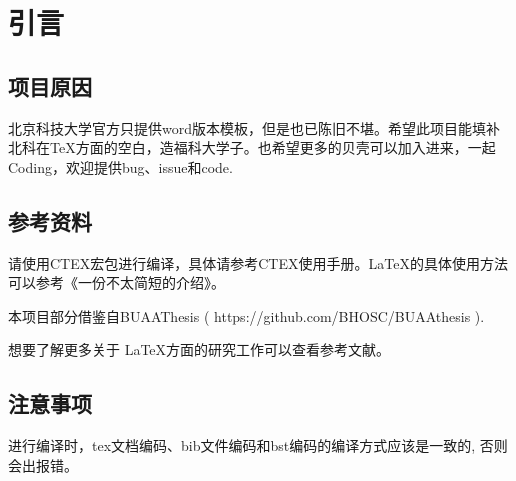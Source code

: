 
\chapter{引言}
\setcounter{page}{1}

\section{项目原因}
北京科技大学官方只提供word版本模板，但是也已陈旧不堪。希望此项目能填补北科在\TeX 方面的空白，造福科大学子。也希望更多的贝壳可以加入进来，一起Coding，欢迎提供bug、issue和code.
\section{参考资料}
请使用CTEX宏包进行编译，具体请参考CTEX使用手册。\LaTeX 的具体使用方法可以参考《一份不太简短的\LaTeXe 介绍》\cite{oetiker2002}。 \par
本项目部分借鉴自BUAAThesis ( https://github.com/BHOSC/BUAAthesis ). \par
想要了解更多关于 \LaTeX 方面的研究工作可以查看参考文献\cite{wenyayuan2012, wangyong2012, niejun2010, majiajia2014, jihongwei2011, duanmaiying2003, chenweide2009}。
\section{注意事项}
进行编译时，tex文档编码、bib文件编码和bst编码的编译方式应该是一致的, 否则会出报错。


